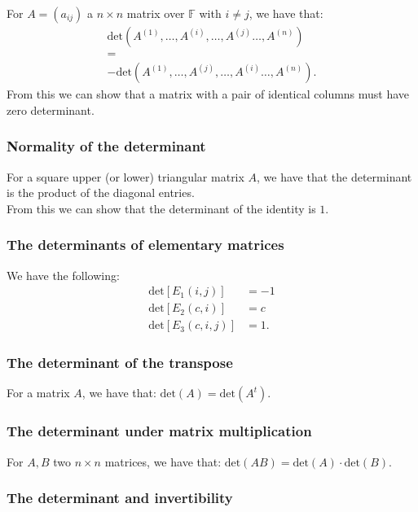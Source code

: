 \documentclass[a4paper, 12pt, twoside]{article}
\begin{document}
For $A = (a_{ij})$ a $n \times n$ matrix over $\mathbb{F}$ with
$i \neq j$, we have that: \begin{gather*}
  \text{det}(A^{(1)}, \ldots, A^{(i)}, \ldots, A^{(j)} \ldots, A^{(n)}) \\
  =\\
  -\text{det}(A^{(1)}, \ldots, A^{(j)}, \ldots, A^{(i)} \ldots, A^{(n)}).
\end{gather*} From this we can show that a matrix with a pair of
identical columns must have zero determinant.

\subsubsection{Normality of the determinant}

For a square upper (or lower) triangular matrix $A$, we have that
the determinant is the product of the diagonal entries.
\\[\baselineskip]
From this we can show that the determinant of the identity is $1$.

\subsubsection{The determinants of elementary matrices}

We have the following: \begin{align*}
  \text{det}\left[E_1(i, j)\right] &= -1 \\
  \text{det}\left[E_2(c, i)\right] &= c \\
  \text{det}\left[E_3(c, i, j)\right] &= 1.
\end{align*}

\subsubsection{The determinant of the transpose}

For a matrix $A$, we have that: $\text{det}(A) = \text{det}(A^t).$

\subsubsection{The determinant under matrix multiplication}

For $A, B$ two $n \times n$ matrices, we have that:
$\text{det}(AB) = \text{det}(A)\cdot\text{det}(B).$

\subsubsection{The determinant and invertibility}
\end{document}
